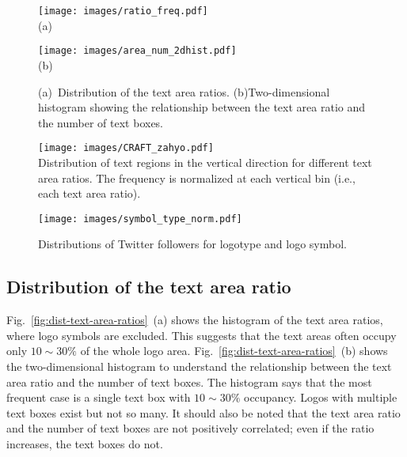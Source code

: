 \documentclass[runningheads]{llncs}
\begin{document}
\begin{figure}[t]
\centering
\begin{minipage}[b]{0.57\textwidth}
    \centering
    \texttt{[image: images/ratio\_freq.pdf]}\\[-1mm]
    (a)
\end{minipage}
\begin{minipage}[b]{0.4\textwidth}
    \centering
    \texttt{[image: images/area\_num\_2dhist.pdf]}\\[-1mm]
 (b)    
\end{minipage}\vspace{-3mm}
    \caption{(a)~Distribution of the text area ratios. (b)Two-dimensional histogram showing the relationship between the text area ratio and the number of text boxes.}
    \label{fig:dist-text-area-ratios}
\medskip
    \texttt{[image: images/CRAFT\_zahyo.pdf]}\\[-5mm]
    \caption{Distribution of text regions in the vertical direction for different text area ratios. The frequency is normalized at each vertical bin (i.e., each text area ratio). }
    \label{fig:vertical-location}
\medskip
    \texttt{[image: images/symbol\_type\_norm.pdf]}\\[-5mm]
    \caption{Distributions of Twitter followers for logotype and logo symbol.}
    \vspace{-3mm}
    \label{fig:follower-compare-1}

\end{figure}
\subsection{Distribution of the text area ratio}
Fig.~\ref{fig:dist-text-area-ratios}~(a) shows the histogram of the text area ratios, where logo symbols are excluded. This suggests that the text areas often occupy only $10\sim 30\%$ of the whole logo area. Fig.~\ref{fig:dist-text-area-ratios}~(b) shows the two-dimensional histogram to understand the relationship between the text area ratio and the number of text boxes. The histogram says that the most frequent case is a single text box with $10\sim 30\%$ occupancy. Logos with multiple text boxes exist but not so many. It should also be noted that the text area ratio and the number of text boxes are not positively correlated; even if the ratio increases, the text boxes do not. 
\end{document}

